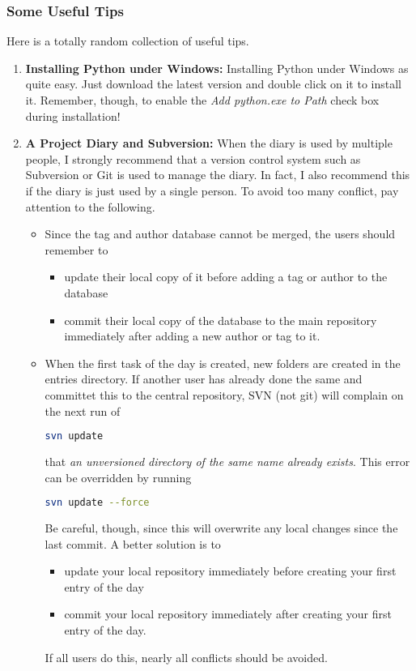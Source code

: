 \subsubsection*{Some Useful Tips}
Here is a totally random collection of useful tips.
\begin{enumerate}
    \item \textbf{Installing  Python under Windows:}\newline
    Installing Python under Windows as quite easy. Just download the latest version and double click on it to install it. Remember, though, to enable the \textit{Add python.exe to Path} check box during installation!
    \item \textbf{A Project Diary and Subversion:}\newline
    When the diary is used by multiple people, I strongly recommend that a version control system such as Subversion or Git is used to manage the diary. In fact, I also recommend this if the diary is just used by a single person. To avoid too many conflict, pay attention to the following.
    \begin{itemize}
        \item Since the tag and author database cannot be merged, the users should remember to
        \begin{itemize}
            \item update their local copy of it before adding a tag or author to the database
            \item commit their local copy of the database to the main repository immediately after adding a new author or tag to it.
        \end{itemize}
        \item When the first task of the day is created, new folders are created in the entries directory. If another user has already done the same and committet this to the central repository, SVN (not git) will complain on the next run of
\begin{lstlisting}[language=bash]
svn update
\end{lstlisting}     
        that \textit{an unversioned directory of the same name already exists}. This error can be overridden by running 
\begin{lstlisting}[language=bash]
svn update --force
\end{lstlisting}
    Be careful, though, since this will overwrite any local changes since the last commit. A better solution is to
        \begin{itemize}
            \item update your local repository immediately before creating your first entry of the day
            \item commit your local repository immediately after creating your first entry of the day.
        \end{itemize}
        If all users do this, nearly all conflicts should be avoided.
    \end{itemize}
\end{enumerate}

